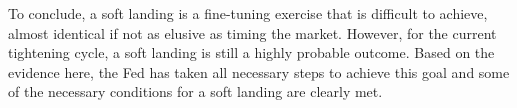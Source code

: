 \documentclass[
  letterpaper,
  DIV=11,
  numbers=noendperiod]{scrartcl}
\begin{document}
To conclude, a soft landing is a fine-tuning exercise that is difficult
to achieve, almost identical if not as elusive as timing the market.
However, for the current tightening cycle, a soft landing is still a
highly probable outcome. Based on the evidence here, the Fed has taken
all necessary steps to achieve this goal and some of the necessary
conditions for a soft landing are clearly met.
\end{document}
